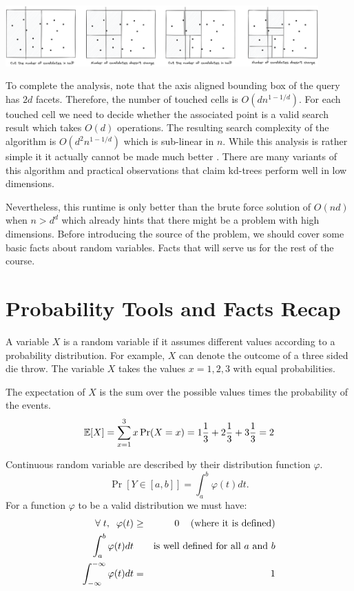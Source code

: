 \documentclass{article}
\begin{document}
\begin{center}
\includegraphics[width=0.9\textwidth]{images/kdtrees-proof.png}
\end{center}

To complete the analysis, note that the axis aligned bounding box of the query has $2d$ facets. Therefore, the number of touched cells is $O(dn^{1-1/d})$.
For each touched cell we need to decide whether the associated point is a valid search result which takes $O(d)$ operations. 
The resulting search complexity of the algorithm is $O(d^2n^{1-1/d})$ which is sub-linear in $n$.
While this analysis is rather simple it it actually cannot be made much better  \cite{kdtree-worstcase}. There are many variants of this algorithm \cite{rptrees} and practical observations that claim kd-trees perform well in low dimensions. 

Nevertheless, this runtime is only better than the brute force solution of $O(nd)$ when $n > d^d$ which already hints that there might be a problem with high dimensions.
Before introducing the source of the problem, we should cover some basic facts about random variables. Facts that will serve us for the rest of the course.


\section{Probability Tools and Facts Recap}

A variable $X$ is a random variable if it assumes different values
according to a probability distribution. For example, $X$ can 
denote the outcome of a three sided die throw. 
The variable $X$ takes the values $x = 1,2,3$ with equal probabilities. 

The expectation of $X$ is the sum over the possible values times the probability of the events.
\begin{equation}
{\mathbb E}[X] = \sum_{x=1}^{3}x \Pr(X = x)=
1\frac{1}{3}+2\frac{1}{3}+3\frac{1}{3} = 2
\end{equation}


Continuous random variable are described by their distribution function $\varphi$.
$$
\Pr[Y \in [a,b]] = \int_{a}^{b}\varphi (t) dt.
$$
For a function $\varphi$ to be a valid distribution we must have:
\begin{eqnarray}
\forall \;t, \;\; \varphi(t) &\ge& 0  \mbox{\;\;\; (where it is defined)}\\
\int_{a}^{b}\varphi (t) dt && \mbox{is well defined for all $a$ and $b$}\\
\int_{-\infty}^{-\infty}\varphi (t) dt &=& 1
\end{eqnarray}
\end{document}
